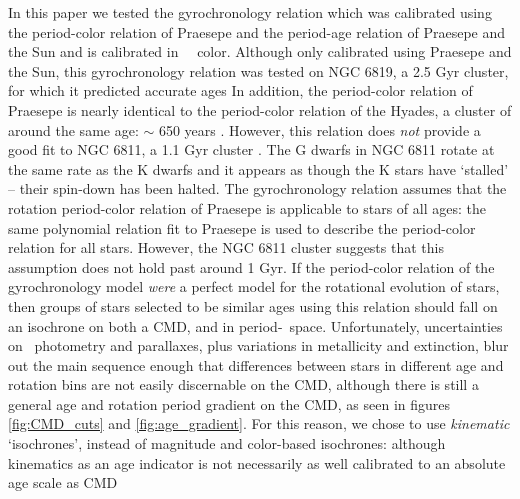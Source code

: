 
In this paper we tested the \citet{angus2019} gyrochronology relation which
was calibrated using the period-color relation of Praesepe and the period-age
relation of Praesepe and the Sun and is calibrated in \gaia\ \gcolor\ color.
Although only calibrated using Praesepe and the Sun, this gyrochronology
relation was tested on NGC 6819, a 2.5 Gyr cluster, for which it predicted
accurate ages
In addition, the period-color relation of Praesepe is nearly identical to the
period-color relation of the Hyades, a cluster of around the same age: $\sim$
650 years \citep{douglas2019}.
However, this relation does {\it not} provide a good fit to NGC 6811, a 1.1
Gyr cluster \citep{curtis2019}.
The G dwarfs in NGC 6811 rotate at the same rate as the K dwarfs and it
appears as though the K stars have `stalled' -- their spin-down has been
halted.
The \citet{angus2019} gyrochronology relation assumes that the rotation
period-color relation of Praesepe is applicable to stars of all ages: the same
polynomial relation fit to Praesepe is used to describe the period-color
relation for all stars.
However, the NGC 6811 cluster suggests that this assumption does not hold past
around 1 Gyr.
If the period-color relation of the \citet{angus2019} gyrochronology model
{\it were} a perfect model for the rotational evolution of stars, then groups
of stars selected to be similar ages using this relation should fall on an
isochrone on both a CMD, and in period-\teff\ space.
Unfortunately, uncertainties on \gaia\ photometry and parallaxes, plus
variations in metallicity and extinction, blur out the main sequence enough
that differences between stars in different age and rotation bins are not
easily discernable on the CMD, although there is still a general age and
rotation period gradient on the CMD, as seen in figures \ref{fig:CMD_cuts} and
\ref{fig:age_gradient}.
For this reason, we chose to use {\it kinematic} `isochrones', instead of
magnitude and color-based isochrones: although kinematics as an age indicator
is not necessarily as well calibrated to an absolute age scale as CMD
